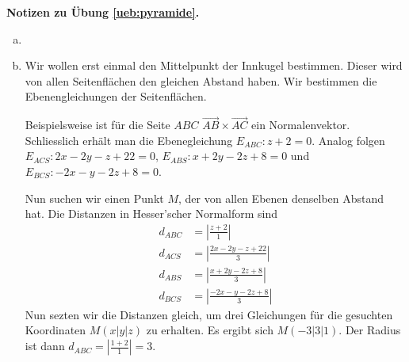 \documentclass[%
11pt,%
twoside,%
titlepage,%
german,%
headsepline%
]{scrartcl}
\theoremstyle{definition}
\theoremstyle{plain}
\newcommand{\concatueb}[1]{ueb:#1}%
\newcommand{\concatlsg}[1]{lsg:#1}%
\newenvironment{lsg}[1]{%
    \par\noindent\textbf{Notizen zu Übung \ref{\concatueb{#1}}.}%
    \label{\concatlsg{#1}}
}{%
    \par%
}
\begin{document}
\begin{lsg}{pyramide}

\begin{enumerate}[a)]
    \item 

\begin{center}
\end{center}

\item Wir wollen erst einmal den Mittelpunkt der Innkugel bestimmen. Dieser wird von allen Seitenflächen den gleichen Abstand haben. Wir bestimmen die Ebenengleichungen der Seitenflächen.

Beispielsweise ist für die Seite $ABC$ $\vec{AB}\times\vec{AC}$ ein Normalenvektor. Schliesslich erhält man die Ebenegleichung $E_{ABC}:z+2=0$. Analog folgen $E_{ACS}:2x-2y-z+22=0$, $E_{ABS}:x+2y-2z+8=0$ und $E_{BCS}:-2x-y-2z+8=0$.

Nun suchen wir einen Punkt $M$, der von allen Ebenen denselben Abstand hat. Die Distanzen in  Hesser'scher Normalform sind
\begin{align}
    d_{ABC} &= \left|\frac{z+2}{1}\right|\\
    d_{ACS} &= \left|\frac{2x-2y-z+22}{3}\right|\\
    d_{ABS} &= \left|\frac{x+2y-2z+8}{3}\right|\\
    d_{BCS} &= \left|\frac{-2x-y-2z+8}{3}\right|
\end{align}
Nun sezten wir die Distanzen gleich, um drei Gleichungen für die gesuchten Koordinaten $M(x|y|z)$ zu erhalten. Es ergibt sich $M(-3|3|1)$. Der Radius ist dann $d_{ABC} = \left|\frac{1+2}{1}\right|=3$.
\end{enumerate}
\end{lsg}
\end{document}
